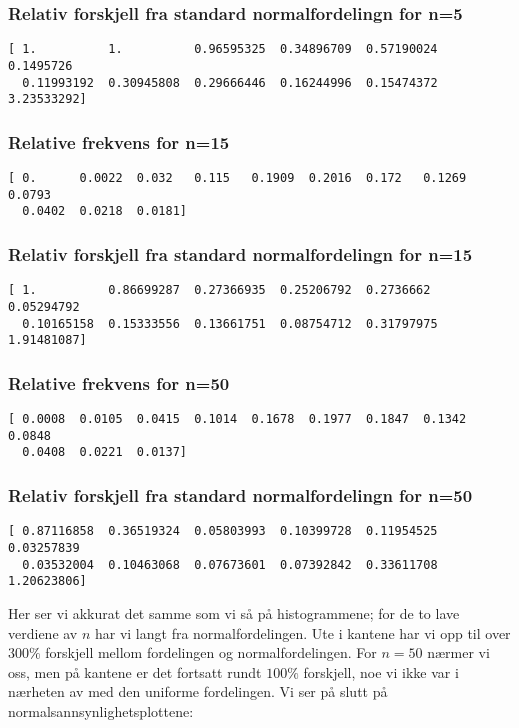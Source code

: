 \documentclass[a4paper,norsk, 10pt]{article}
\begin{document}
\subsubsection*{Relativ forskjell fra standard normalfordelingn for n=5}
\begin{Verbatim}[frame = single]
[ 1.          1.          0.96595325  0.34896709  0.57190024  0.1495726
  0.11993192  0.30945808  0.29666446  0.16244996  0.15474372  3.23533292]
\end{Verbatim}

\subsubsection*{Relative frekvens for n=15}
\begin{Verbatim}[frame = single]
[ 0.      0.0022  0.032   0.115   0.1909  0.2016  0.172   0.1269  0.0793
  0.0402  0.0218  0.0181]
\end{Verbatim}

\subsubsection*{Relativ forskjell fra standard normalfordelingn for n=15}
\begin{Verbatim}[frame = single]
[ 1.          0.86699287  0.27366935  0.25206792  0.2736662   0.05294792
  0.10165158  0.15333556  0.13661751  0.08754712  0.31797975  1.91481087]
\end{Verbatim}

\subsubsection*{Relative frekvens for n=50}
\begin{Verbatim}[frame = single]
[ 0.0008  0.0105  0.0415  0.1014  0.1678  0.1977  0.1847  0.1342  0.0848
  0.0408  0.0221  0.0137]
\end{Verbatim}

\subsubsection*{Relativ forskjell fra standard normalfordelingn for n=50}
\begin{Verbatim}[frame = single]
[ 0.87116858  0.36519324  0.05803993  0.10399728  0.11954525  0.03257839
  0.03532004  0.10463068  0.07673601  0.07392842  0.33611708  1.20623806]
\end{Verbatim}


Her ser vi akkurat det samme som vi så på histogrammene; for de to lave verdiene av $n$ har vi langt fra normalfordelingen. Ute i kantene har vi opp til over $300\%$ forskjell mellom fordelingen og normalfordelingen. For $n = 50$ nærmer vi oss, men på kantene er det fortsatt rundt $100\%$ forskjell, noe vi ikke var i nærheten av med den uniforme fordelingen. Vi ser på slutt på normalsannsynlighetsplottene:
\end{document}
